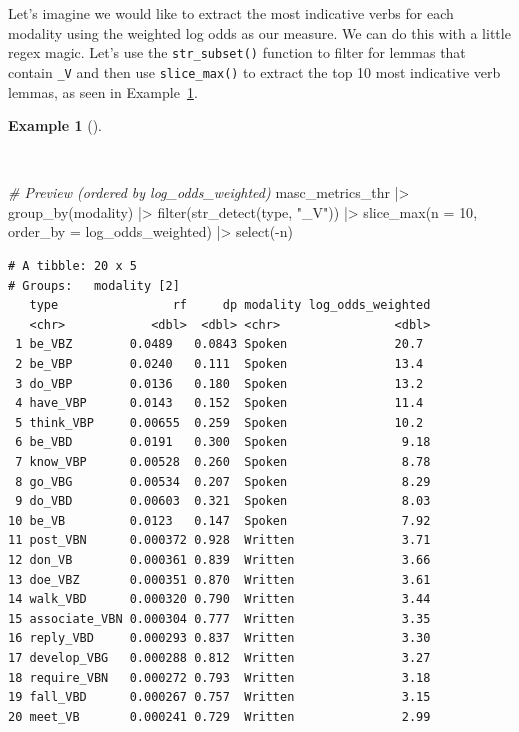 \documentclass[
  letterpaper,
  krantz1]{latex/krantz-mod}
\newenvironment{Shaded}{\begin{snugshade}}{\end{snugshade}}
\newcommand{\AttributeTok}[1]{\textcolor[rgb]{0.00,0.00,0.00}{#1}}
\newcommand{\CommentTok}[1]{\textcolor[rgb]{0.00,0.00,0.00}{\textit{#1}}}
\newcommand{\DecValTok}[1]{\textcolor[rgb]{0.00,0.00,0.00}{#1}}
\newcommand{\FunctionTok}[1]{\textcolor[rgb]{0.00,0.00,0.00}{#1}}
\newcommand{\NormalTok}[1]{\textcolor[rgb]{0.00,0.00,0.00}{#1}}
\newcommand{\SpecialCharTok}[1]{\textcolor[rgb]{0.00,0.00,0.00}{#1}}
\newcommand{\StringTok}[1]{\textcolor[rgb]{0.00,0.00,0.00}{#1}}
\theoremstyle{definition}
\theoremstyle{definition}
\newtheorem{example}{Example}[chapter]
\theoremstyle{remark}
\begin{document}
Let's imagine we would like to extract the most indicative verbs for
each modality using the weighted log odds as our measure. We can do this
with a little regex magic. Let's use
the \texttt{str\_subset()} function to filter for lemmas that contain
\texttt{\_V} and then use \texttt{slice\_max()} to extract the top 10
most indicative verb lemmas, as seen in
Example~\ref{exm-explore-masc-log-odds-weighted-verbs}.

\begin{example}[]\protect\hypertarget{exm-explore-masc-log-odds-weighted-verbs}{}\label{exm-explore-masc-log-odds-weighted-verbs}

~

\begin{Shaded}
\begin{Highlighting}[numbers=left,,]
\CommentTok{\# Preview (ordered by log\_odds\_weighted)}
\NormalTok{masc\_metrics\_thr }\SpecialCharTok{|\textgreater{}}
  \FunctionTok{group\_by}\NormalTok{(modality) }\SpecialCharTok{|\textgreater{}}
  \FunctionTok{filter}\NormalTok{(}\FunctionTok{str\_detect}\NormalTok{(type, }\StringTok{"\_V"}\NormalTok{)) }\SpecialCharTok{|\textgreater{}}
  \FunctionTok{slice\_max}\NormalTok{(}\AttributeTok{n =} \DecValTok{10}\NormalTok{, }\AttributeTok{order\_by =}\NormalTok{ log\_odds\_weighted) }\SpecialCharTok{|\textgreater{}}
  \FunctionTok{select}\NormalTok{(}\SpecialCharTok{{-}}\NormalTok{n)}
\end{Highlighting}
\end{Shaded}

\begin{verbatim}
# A tibble: 20 x 5
# Groups:   modality [2]
   type                rf     dp modality log_odds_weighted
   <chr>            <dbl>  <dbl> <chr>                <dbl>
 1 be_VBZ        0.0489   0.0843 Spoken               20.7 
 2 be_VBP        0.0240   0.111  Spoken               13.4 
 3 do_VBP        0.0136   0.180  Spoken               13.2 
 4 have_VBP      0.0143   0.152  Spoken               11.4 
 5 think_VBP     0.00655  0.259  Spoken               10.2 
 6 be_VBD        0.0191   0.300  Spoken                9.18
 7 know_VBP      0.00528  0.260  Spoken                8.78
 8 go_VBG        0.00534  0.207  Spoken                8.29
 9 do_VBD        0.00603  0.321  Spoken                8.03
10 be_VB         0.0123   0.147  Spoken                7.92
11 post_VBN      0.000372 0.928  Written               3.71
12 don_VB        0.000361 0.839  Written               3.66
13 doe_VBZ       0.000351 0.870  Written               3.61
14 walk_VBD      0.000320 0.790  Written               3.44
15 associate_VBN 0.000304 0.777  Written               3.35
16 reply_VBD     0.000293 0.837  Written               3.30
17 develop_VBG   0.000288 0.812  Written               3.27
18 require_VBN   0.000272 0.793  Written               3.18
19 fall_VBD      0.000267 0.757  Written               3.15
20 meet_VB       0.000241 0.729  Written               2.99
\end{verbatim}


\end{example}
\end{document}
